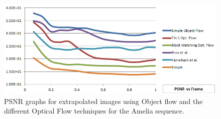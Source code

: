    \begin{figure}[th]
      \centering
      \includegraphics[width=1.0\textwidth]{../images/psnr2.png}
      \caption{PSNR graphs for extrapolated images using Object flow and the different Optical Flow techniques for the Amelia sequence. }
      \label{of_res2}
   \end{figure}
	\setlength{\belowcaptionskip}{-10pt}
